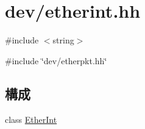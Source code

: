 \hypertarget{etherint_8hh}{
\section{dev/etherint.hh}
\label{etherint_8hh}
}
{\ttfamily \#include $<$string$>$}\par
{\ttfamily \#include \char`\"{}dev/etherpkt.hh\char`\"{}}\par
\subsection*{構成}
\begin{DoxyCompactItemize}
\item 
class \hyperlink{classEtherInt}{EtherInt}
\end{DoxyCompactItemize}
